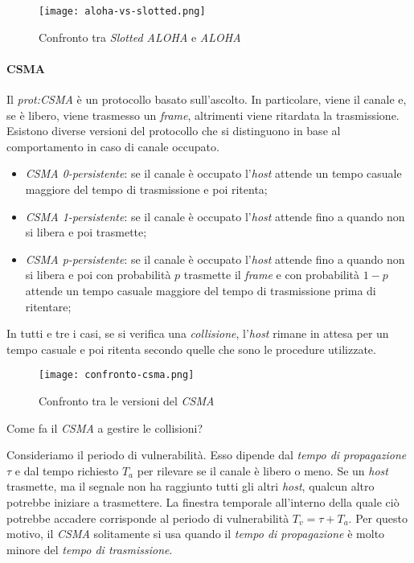\begin{figure}[h!]
    \centering
    \texttt{[image: aloha-vs-slotted.png]}
    \caption{Confronto tra \emph{Slotted ALOHA} e \emph{ALOHA}}
\end{figure}

\paragraph{CSMA}
Il \emph{\gls{prot:CSMA}} è un protocollo basato sull'ascolto. In particolare,
viene  il canale e, se è libero, viene trasmesso un
\emph{frame}, altrimenti viene ritardata la trasmissione. Esistono diverse
versioni del protocollo che si distinguono in base al comportamento in caso di
canale occupato.
\begin{itemize}
    \item \emph{CSMA 0-persistente}: se il canale è occupato l'\emph{host}
    attende un tempo casuale maggiore del tempo di trasmissione e poi ritenta;
    \item \emph{CSMA 1-persistente}: se il canale è occupato l'\emph{host}
    attende fino a quando non si libera e poi trasmette;
    \item \emph{CSMA p-persistente}: se il canale è occupato l'\emph{host}
    attende fino a quando non si libera e poi con probabilità $p$ trasmette il
    \emph{frame} e con probabilità $1-p$ attende un tempo casuale maggiore del
    tempo di trasmissione prima di ritentare;
\end{itemize}
In tutti e tre i casi, se si verifica una \emph{collisione}, l'\emph{host}
rimane in attesa per un tempo casuale e poi ritenta secondo quelle che sono le
procedure utilizzate.

\begin{figure}[ht!]
    \centering
    \texttt{[image: confronto-csma.png]}
    \caption{Confronto tra le versioni del \emph{CSMA}}
\end{figure}

\newpage\noindent
Come fa il \emph{CSMA} a gestire le collisioni?

Consideriamo il periodo di vulnerabilità. Esso dipende dal \emph{tempo di
propagazione} $\tau$ e dal tempo richiesto $T_a$ per rilevare se il canale è
libero o meno. Se un \emph{host} trasmette, ma il segnale non ha raggiunto tutti
gli altri \emph{host}, qualcun altro potrebbe iniziare a trasmettere. La finestra
temporale all'interno della quale ciò potrebbe accadere corrisponde al periodo
di vulnerabilità $T_v=\tau+T_a$. Per questo motivo, il \emph{CSMA} solitamente
si usa quando il \emph{tempo di propagazione} è molto minore del \emph{tempo di
trasmissione}.

